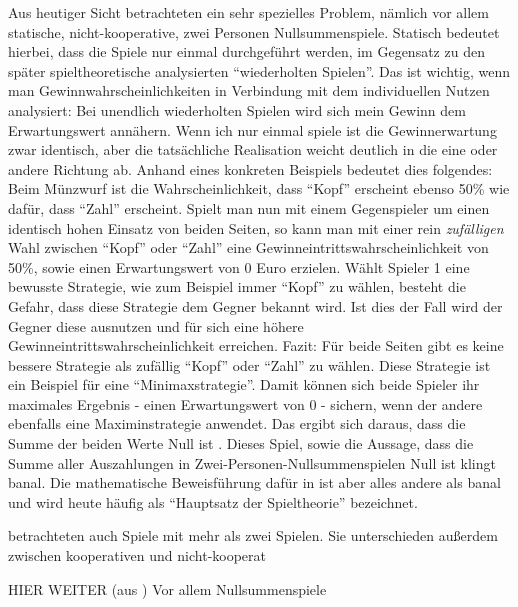 Aus heutiger Sicht betrachteten \textcite{VonNeumann1944} ein sehr spezielles Problem, nämlich vor allem statische, nicht-kooperative, zwei Personen Nullsummenspiele. Statisch bedeutet hierbei, dass die Spiele nur einmal durchgeführt werden, im Gegensatz zu den später spieltheoretische analysierten "`wiederholten Spielen"'. Das ist wichtig, wenn man Gewinnwahrscheinlichkeiten in Verbindung mit dem individuellen Nutzen analysiert: Bei unendlich wiederholten Spielen wird sich mein Gewinn dem Erwartungswert annähern. Wenn ich nur einmal spiele ist die Gewinnerwartung zwar identisch, aber die tatsächliche Realisation weicht deutlich in die eine oder andere Richtung ab.
Anhand eines konkreten Beispiels bedeutet dies folgendes: Beim Münzwurf ist die Wahrscheinlichkeit, dass "`Kopf"' erscheint ebenso 50\% wie dafür, dass "`Zahl"' erscheint. Spielt man nun mit einem Gegenspieler um einen identisch hohen Einsatz von beiden Seiten, so kann man mit einer rein \textit{zufälligen} Wahl zwischen "`Kopf"' oder "`Zahl"' eine Gewinneintrittswahrscheinlichkeit von 50\%, sowie einen Erwartungswert von 0 Euro erzielen. Wählt Spieler 1 eine bewusste Strategie, wie zum Beispiel immer "`Kopf"' zu wählen, besteht die Gefahr, dass diese Strategie dem Gegner bekannt wird. Ist dies der Fall wird der Gegner diese ausnutzen und für sich eine höhere Gewinneintrittswahrscheinlichkeit erreichen. Fazit: Für beide Seiten gibt es keine bessere Strategie als zufällig "`Kopf"' oder "`Zahl"' zu wählen. Diese Strategie ist ein Beispiel für eine "`Minimaxstrategie"'. Damit können sich beide Spieler ihr maximales Ergebnis - einen Erwartungswert von 0 -  sichern, wenn der andere ebenfalls eine Maximinstrategie anwendet. Das ergibt sich daraus, dass die Summe der beiden Werte Null ist \parencite{Selten2001}. Dieses Spiel, sowie die Aussage, dass die Summe aller Auszahlungen in Zwei-Personen-Nullsummenspielen Null ist klingt banal. Die mathematische Beweisführung dafür in \textcite{VonNeumann1928} ist aber alles andere als banal und wird heute häufig als "`Hauptsatz der Spieltheorie"' bezeichnet.

\textcite{Morgenstern1944} betrachteten auch Spiele mit mehr als zwei Spielen. Sie unterschieden außerdem zwischen kooperativen und nicht-kooperat




HIER WEITER (aus \textcite[S. 6ff]{Selten2001}) Vor allem Nullsummenspiele


